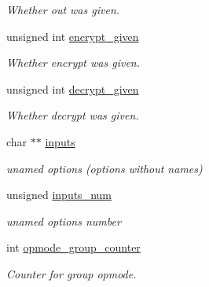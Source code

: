 \begin{DoxyCompactItemize}
\begin{DoxyCompactList}\small\item\em Whether out was given. \end{DoxyCompactList}\item 
\mbox{\label{structgengetopt__args__info_a2cc94a70a7e771ee78c947d08dd8cf1d}} 
unsigned int \hyperlink{structgengetopt__args__info_a2cc94a70a7e771ee78c947d08dd8cf1d}{encrypt\+\_\+given}
\begin{DoxyCompactList}\small\item\em Whether encrypt was given. \end{DoxyCompactList}\item 
\mbox{\label{structgengetopt__args__info_ab8fb4a2ce4915d98294802d3b361325f}} 
unsigned int \hyperlink{structgengetopt__args__info_ab8fb4a2ce4915d98294802d3b361325f}{decrypt\+\_\+given}
\begin{DoxyCompactList}\small\item\em Whether decrypt was given. \end{DoxyCompactList}\item 
\mbox{\label{structgengetopt__args__info_a9604690019dd09b318302dae6868726c}} 
char $\ast$$\ast$ \hyperlink{structgengetopt__args__info_a9604690019dd09b318302dae6868726c}{inputs}
\begin{DoxyCompactList}\small\item\em unamed options (options without names) \end{DoxyCompactList}\item 
\mbox{\label{structgengetopt__args__info_a3d69c180d5ac0b1124fd9a6fe680706c}} 
unsigned \hyperlink{structgengetopt__args__info_a3d69c180d5ac0b1124fd9a6fe680706c}{inputs\+\_\+num}
\begin{DoxyCompactList}\small\item\em unamed options number \end{DoxyCompactList}\item 
\mbox{\label{structgengetopt__args__info_a44f277219c706b8ca8b64ce3d9f3f2ec}} 
int \hyperlink{structgengetopt__args__info_a44f277219c706b8ca8b64ce3d9f3f2ec}{opmode\+\_\+group\+\_\+counter}
\begin{DoxyCompactList}\small\item\em Counter for group opmode. \end{DoxyCompactList}\end{DoxyCompactItemize}


